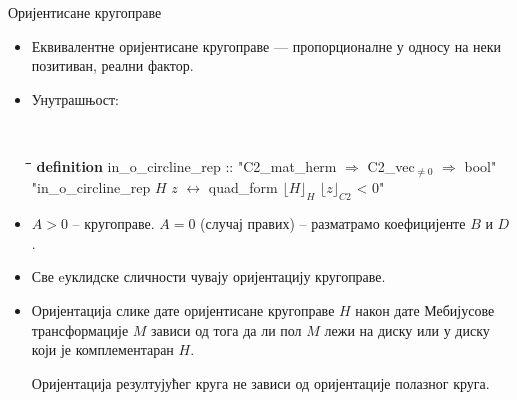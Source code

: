 \documentclass[slidestop, compress, mathserif, containsverbatim, xcolor=dvipsnames]{beamer}
\newcommand{\Repnzv}[1]{\ensuremath{\lfloor#1\rfloor_{C2}}}
\newcommand{\Repcm}[1]{\ensuremath{\lfloor#1\rfloor_{H}}}
\begin{document}
\begin{frame}[shrink]{Оријентисане кругоправе}
  \begin{itemize}
  \item Еквивалентне оријентисане кругоправе --- пропорционалне у
    односу на неки позитиван, реални фактор.
  \item Унутрашњост: \begin{footnotesize} {\tt
      \begin{tabbing}
        \hspace{5mm}\=\hspace{5mm}\=\hspace{5mm}\=\hspace{5mm}\=\hspace{5mm}\=\kill
        {\bf definition} in\_o\_circline\_rep :: "{}C2\_mat\_herm $\Rightarrow$ C2\_vec$_{\neq 0}$ $\Rightarrow$ bool"\\
         "in\_o\_circline\_rep $H$ $z$ $\longleftrightarrow$ quad\_form $\Repcm{H}$ $\Repnzv{z}$ < 0"\\
      \end{tabbing}
  } \end{footnotesize}
  \item $A > 0$ --  кругоправе. $A =
    0$ (случај правих) -- разматрамо коефицијенте $B$ и $D$.
  \item Све eуклидске сличности чувају оријентацију кругоправе. 
  \item Оријентација слике дате оријентисане кругоправе $H$ након дате
    Мебијусове трансформације $M$ зависи од тога да ли пол $M$ лежи на
    диску или у диску који је комплементаран $H$.

    \begin{block}{}
      Оријентација резултујућег круга не зависи од оријентације
      полазног круга.
    \end{block}
  \end{itemize}
\end{frame}
\end{document}

